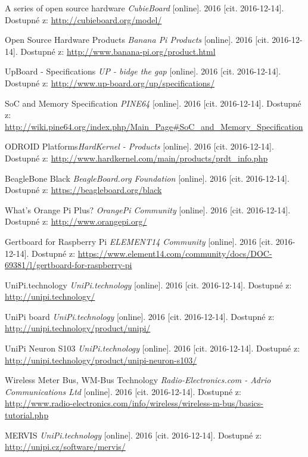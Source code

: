 \begin{literatura}{99}
 A series of open source hardware \textit{CubieBoard} [online]. 2016 [cit. 2016-12-14]. Dostupné z: \url{http://cubieboard.org/model/}
				
 Open Source Hardware Products \textit{Banana Pi Products} [online]. 2016 [cit. 2016-12-14]. Dostupné z: \url{http://www.banana-pi.org/product.html}

 UpBoard - Specifications \textit{UP - bidge the gap} [online]. 2016 [cit. 2016-12-14]. Dostupné z: \url{http://www.up-board.org/up/specifications/}

 SoC and Memory Specification \textit{PINE64} [online]. 2016 [cit. 2016-12-14]. Dostupné z: \url{http://wiki.pine64.org/index.php/Main\_Page\#SoC\_and\_Memory\_Specification}

 ODROID Platforms\textit{HardKernel - Products} [online]. 2016 [cit. 2016-12-14]. Dostupné z: \url{http://www.hardkernel.com/main/products/prdt\_info.php}

 BeagleBone Black \textit{BeagleBoard.org Foundation} [online]. 2016 [cit. 2016-12-14]. Dostupné z: \url{https://beagleboard.org/black}

 What’s Orange Pi Plus? \textit{OrangePi Community} [online]. 2016 [cit. 2016-12-14]. Dostupné z: \url{http://www.orangepi.org/}

 Gertboard for Raspberry Pi \textit{ELEMENT14 Community} [online]. 2016 [cit. 2016-12-14]. Dostupné z: \url{https://www.element14.com/community/docs/DOC-69381/l/gertboard-for-raspberry-pi}

 UniPi.technology \textit{UniPi.technology} [online]. 2016 [cit. 2016-12-14]. Dostupné z: \url{http://unipi.technology/}
				
 UniPi board \textit{UniPi.technology} [online]. 2016 [cit. 2016-12-14]. Dostupné z: \url{http://unipi.technology/product/unipi/}
				
 UniPi Neuron S103 \textit{UniPi.technology} [online]. 2016 [cit. 2016-12-14]. Dostupné z: \url{http://unipi.technology/product/unipi-neuron-s103/}

 Wireless Meter Bus, WM-Bus Technology \textit{Radio-Electronics.com - Adrio Communications Ltd} [online]. 2016 [cit. 2016-12-14]. Dostupné z: \url{http://www.radio-electronics.com/info/wireless/wireless-m-bus/basics-tutorial.php}
				
 MERVIS \textit{UniPi.technology} [online]. 2016 [cit. 2016-12-14]. Dostupné z: \url{http://unipi.cz/software/mervis/}


\end{literatura}
